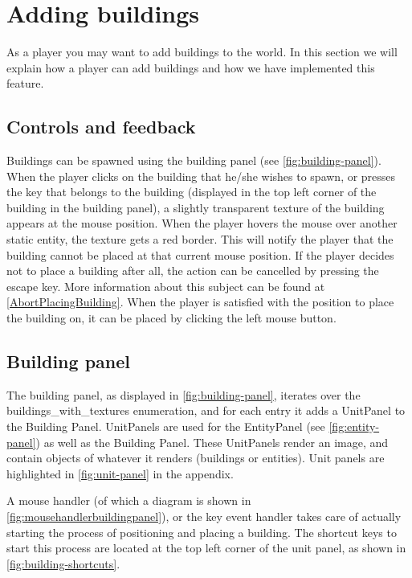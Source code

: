 \section{Adding buildings} 
\label{sec:addingbuildings} 
As a player you may want to add buildings to the world. In this section we 
will explain how a player can add buildings and how we have implemented this 
feature.

\subsection{Controls and feedback} 
Buildings can be spawned using the building panel (see 
\cref{fig:building-panel}). When the player clicks on the building that he/she 
wishes to spawn, or presses the key that belongs to the building
(displayed in the top left corner of the building in the building panel), a
slightly transparent texture of the building appears at the mouse position.
When the player hovers the mouse over another static entity, the texture gets a
red border. This will notify the player that the building cannot be placed at
that current mouse position. If the player decides not to place a building
after all, the action can be cancelled by pressing the escape key. More 
information about this subject can be found at \cref{AbortPlacingBuilding}. 
When the player is satisfied with the position to place the building on, it 
can be placed by clicking the left mouse button. 

\subsection{Building panel} 
The building panel, as displayed in \cref{fig:building-panel}, iterates over 
the buildings\_with\_textures enumeration, and for each entry it adds a 
UnitPanel to the Building Panel. UnitPanels are used for the EntityPanel (see 
\cref{fig:entity-panel}) as well as the Building Panel. These UnitPanels render an 
image, and contain objects of whatever it renders (buildings or entities). 
Unit panels are highlighted in \cref{fig:unit-panel} in the appendix.

A mouse handler (of which a diagram is shown in
\cref{fig:mousehandlerbuildingpanel}), or the key event handler takes care of
actually starting the process of positioning and placing a building. The
shortcut keys to start this process are located at the top left corner of the
unit panel, as shown in \cref{fig:building-shortcuts}.

